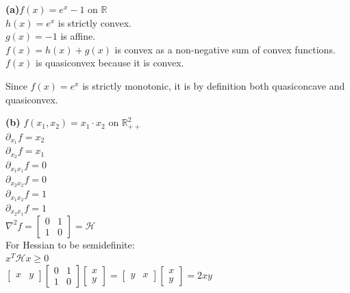 \documentclass{article}
\begin{document}
\noindent \textbf{(a)}$f(x) = e^x - 1$ on $\mathbb{R}$ \\

\noindent $h(x) = e^x$ is strictly convex. \\
$g(x) = -1$ is affine. \\
$f(x) = h(x) + g(x)$ is convex as a non-negative sum of convex functions. \\

\noindent $f(x)$ is quasiconvex because it is convex.

\noindent Since $f(x) = e^x$ is strictly monotonic, it is by definition both quasiconcave and quasiconvex.

\medskip


\noindent \textbf{(b)}  $f(x_1, x_2) = x_1 \cdot x_2$ on $\mathbb{R}_{++}^2$ \\

\noindent $\partial_{x_1} f = x_2$ \\
$\partial_{x_2} f = x_1$ \\
$\partial_{x_1 x_1} f = 0$ \\
$\partial_{x_2 x_2} f = 0$ \\
$\partial_{x_1 x_2} f = 1$ \\
$\partial_{x_2 x_1} f = 1$ \\

\noindent $\nabla^2 f = \begin{bmatrix} 0 & 1 \\ 1 & 0 \end{bmatrix} = \mathcal{H}$ \\

\noindent For Hessian to be semidefinite: \\
$x^T \mathcal{H} x \geq 0$ \\

\noindent $\begin{bmatrix} x & y \end{bmatrix} \begin{bmatrix} 0 & 1 \\ 1 & 0 \end{bmatrix} \begin{bmatrix} x \\ y \end{bmatrix} = \begin{bmatrix} y & x \end{bmatrix} \begin{bmatrix} x \\ y \end{bmatrix} = 2xy$ \\
\end{document}
